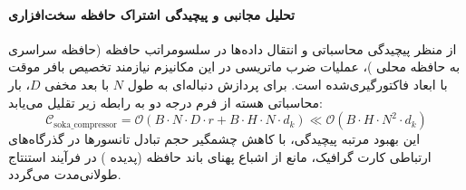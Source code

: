 \paragraph{تحلیل مجانبی و پیچیدگی اشتراک حافظه سخت‌افزاری}
از منظر پیچیدگی محاسباتی و انتقال داده‌ها در سلسومراتب حافظه (حافظه سراسری  به حافظه محلی )، عملیات ضرب ماتریسی در این مکانیزم نیازمند تخصیص بافر موقت با ابعاد فاکتورگیری‌شده است. برای پردازش دنباله‌ای به طول $N$ با بعد مخفی $D$، بار محاسباتی هسته از فرم درجه دو به رابطه زیر تقلیل می‌یابد:
\begin{equation}
\label{eq:complexity_soka_compressor}
\mathcal{C}_{\text{soka\_compressor}} = \mathcal{O}\left( B \cdot N \cdot D \cdot r + B \cdot H \cdot N \cdot d_k \right) \ll \mathcal{O}\left( B \cdot H \cdot N^2 \cdot d_k \right)
\end{equation}
این بهبود مرتبه پیچیدگی، با کاهش چشمگیر حجم تبادل تانسورها در گذرگاه‌های ارتباطی کارت گرافیک، مانع از اشباع پهنای باند حافظه (پدیده ) در فرآیند استنتاج طولانی‌مدت می‌گردد.
